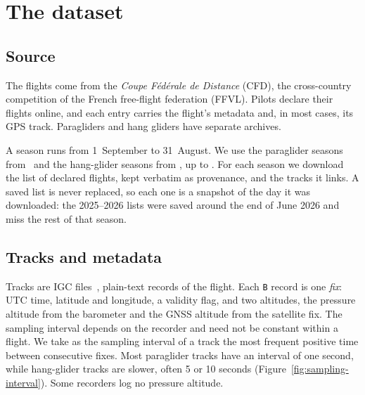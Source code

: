 \chapter{The dataset}
\label{ch:dataset}

\section{Source}
\label{sec:source}

The flights come from the \emph{Coupe F\'ed\'erale de Distance} (CFD), the
cross-country competition of the French free-flight federation (FFVL). Pilots declare
their flights online, and each entry carries the flight's metadata and, in most
cases, its GPS track. Paragliders and hang gliders have separate archives.

A season runs from 1~September to 31~August. We use the paraglider seasons from
\ParaSeasonFirst\ and the hang-glider seasons from \HangSeasonFirst, up to \ParaSeasonLast. For each
season we download the list of declared flights, kept verbatim as provenance, and
the tracks it links. A saved list is never replaced, so each one is a snapshot of
the day it was downloaded: the 2025--2026 lists were saved around the end of June
2026 and miss the rest of that season.

\begin{table}[htbp]
\centering\small
\caption{Paraglider flights per season.}
\label{tab:seasons-para}

\end{table}

\begin{table}[htbp]
\centering\small
\caption{Hang-glider flights per season.}
\label{tab:seasons-hang}

\end{table}

\section{Tracks and metadata}
\label{sec:tracks}

Tracks are IGC files~\cite{fai_igc_spec}, plain-text records of the flight. Each
\texttt{B} record is one \emph{fix}: UTC time, latitude and longitude, a validity flag,
and two altitudes, the pressure altitude from the barometer and the GNSS altitude from
the satellite fix. The sampling interval depends on the recorder and need not be
constant within a flight. We take as the sampling interval of a track the most frequent
positive time between consecutive fixes. Most paraglider tracks have an interval of one second, while
hang-glider tracks are slower, often 5 or 10 seconds (Figure~\ref{fig:sampling-interval}).
Some recorders log no pressure altitude.

